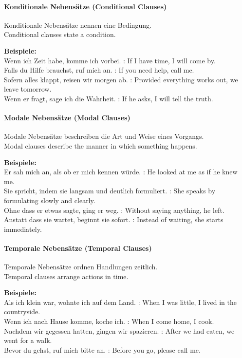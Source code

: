 \documentclass[a4paper]{article}
\begin{document}
    \paragraph{Konditionale Nebensätze {\small (Conditional Clauses)}}
        Konditionale Nebensätze nennen eine Bedingung.\\
        Conditional clauses state a condition.
        
        \textbf{Beispiele:}\\
        Wenn ich Zeit habe, komme ich vorbei. : If I have time, I will come by.\\
        Falls du Hilfe brauchst, ruf mich an. : If you need help, call me.\\
        Sofern alles klappt, reisen wir morgen ab. : Provided everything works out, we leave tomorrow.\\
        Wenn er fragt, sage ich die Wahrheit. : If he asks, I will tell the truth.
    
    \paragraph{Modale Nebensätze {\small (Modal Clauses)}}
        Modale Nebensätze beschreiben die Art und Weise eines Vorgangs.\\
        Modal clauses describe the manner in which something happens.
        
        \textbf{Beispiele:}\\
        Er sah mich an, als ob er mich kennen würde. : He looked at me as if he knew me.\\
        Sie spricht, indem sie langsam und deutlich formuliert. : She speaks by formulating slowly and clearly.\\
        Ohne dass er etwas sagte, ging er weg. : Without saying anything, he left.\\
        Anstatt dass sie wartet, beginnt sie sofort. : Instead of waiting, she starts immediately.
    
    \paragraph{Temporale Nebensätze {\small (Temporal Clauses)}}
        Temporale Nebensätze ordnen Handlungen zeitlich.\\
        Temporal clauses arrange actions in time.
        
        \textbf{Beispiele:}\\
        Als ich klein war, wohnte ich auf dem Land. : When I was little, I lived in the countryside.\\
        Wenn ich nach Hause komme, koche ich. : When I come home, I cook.\\
        Nachdem wir gegessen hatten, gingen wir spazieren. : After we had eaten, we went for a walk.\\
        Bevor du gehst, ruf mich bitte an. : Before you go, please call me.
    
\end{document}
